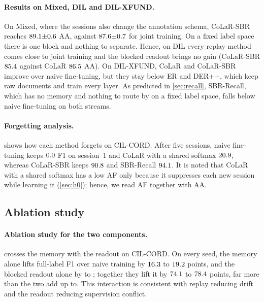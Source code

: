 \documentclass[10pt,twocolumn,letterpaper]{article}
\begin{document}
\paragraph{Results on Mixed, DIL and DIL-XFUND.} On Mixed, where the sessions also change the annotation schema, CoLaR-SBR reaches $89.1{\pm}0.6$ AA, against $87.6{\pm}0.7$ for joint training. On a fixed label space there is one block and nothing to separate. Hence, on DIL every replay method comes close to joint training and the blocked readout brings no gain (CoLaR-SBR $85.4$ against CoLaR $86.5$ AA). On DIL-XFUND, CoLaR and CoLaR-SBR improve over naive fine-tuning, but they stay below ER and DER++, which keep raw documents and train every layer. As predicted in \cref{sec:recall}, SBR-Recall, which has no memory and nothing to route by on a fixed label space, falls below naive fine-tuning on both streams.

\paragraph{Forgetting analysis.}  shows how each method forgets on CIL-CORD. After five sessions, naive fine-tuning keeps $0.0$ F1 on session~1 and CoLaR with a shared softmax $20.9$, whereas CoLaR-SBR keeps $90.8$ and SBR-Recall $94.1$. It is noted that CoLaR with a shared softmax has a low AF only because it suppresses each new session while learning it (\cref{sec:h0}); hence, we read AF together with AA.

\subsection{Ablation study}
\label{sec:ablations}
\begin{table}[t]
\centering\small
\setlength{\tabcolsep}{3pt}
\caption{\textbf{The two components} on CIL-CORD (mean $\pm$ s.d. over three seeds).}
\label{tab:2x2}
\resizebox{\linewidth}{!}{}
\end{table}

\paragraph{Ablation study for the two components.}  crosses the memory with the readout on CIL-CORD. On every seed, the memory alone lifts full-label F1 over naive training by $16.3$ to $19.2$ points, and the blocked readout alone by \nAblReadMin{} to \nAblReadMax; together they lift it by $74.1$ to $78.4$ points, far more than the two add up to. This interaction is consistent with replay reducing drift and the readout reducing supervision conflict.
\end{document}
